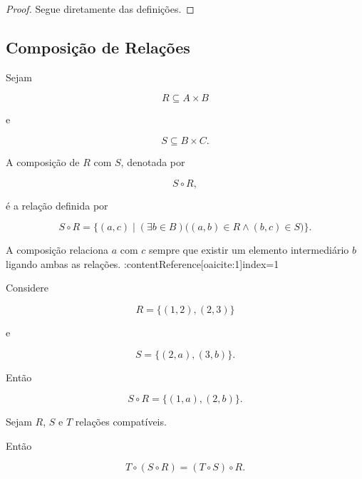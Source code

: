 \documentclass[../../main]{subfiles}
\begin{document}
\begin{proof}

	Segue diretamente das definições.

\end{proof}

\subsection{Composição de Relações}

\begin{defn}
	\label{def:matematica:relacoes:operacoes:composicao}

	Sejam

	\[
		R \subseteq A\times B
	\]

	e

	\[
		S \subseteq B\times C.
	\]

	A composição de \(R\) com \(S\), denotada por

	\[
		S\circ R,
	\]

	é a relação definida por

	\[
		S\circ R
		=
		\{
		(a,c)
		\mid
		(\exists b\in B)
		\bigl(
		(a,b)\in R
		\land
		(b,c)\in S
		\bigr)
		\}.
	\]

\end{defn}

\begin{obs}

	A composição relaciona \(a\) com \(c\) sempre que existir um elemento
	intermediário \(b\) ligando ambas as relações. :contentReference[oaicite:1]{index=1}

\end{obs}

\begin{ex}

	Considere

	\[
		R
		=
		\{
		(1,2),
		(2,3)
		\}
	\]

	e

	\[
		S
		=
		\{
		(2,a),
		(3,b)
		\}.
	\]

	Então

	\[
		S\circ R
		=
		\{
		(1,a),
		(2,b)
		\}.
	\]

\end{ex}

\begin{prop}
	\label{prop:matematica:relacoes:operacoes:associatividade-composicao}

	Sejam \(R\), \(S\) e \(T\) relações compatíveis.

	Então

	\[
		T\circ(S\circ R)
		=
		(T\circ S)\circ R.
	\]

\end{prop}
\end{document}
